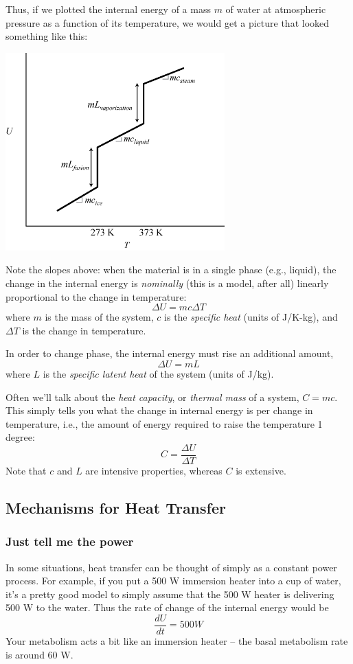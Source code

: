\documentclass[10pt]{book}
\newcommand{\beforefig}{\vspace{0.2in}}
\newcommand{\afterfig}{\vspace{0.2in}}
\begin{document}
Thus, if we plotted the internal energy of a mass $m$ of water at atmospheric pressure as a function of its temperature, we would get a picture that looked something like this:

\beforefig
 \centerline{\includegraphics[height=3in]{figs/SpecificHeatWater}}
\afterfig

Note the slopes above: when the material is in a single phase (e.g., liquid), the change in the internal energy is {\it nominally} (this is a model, after all) linearly proportional to the change in temperature:
$$ \Delta U = m c \Delta T$$
where $m$  is the mass of the system, $c$ is the {\it specific heat} (units of J/K-kg), and $\Delta T$ is the change in temperature.

In order to change phase, the internal energy must rise an additional amount,
$$\Delta U = m L$$
where $L$ is the {\it specific latent heat} of the system (units of J/kg).

Often we'll talk about the {\it heat capacity}, or {\it thermal mass} of a system, $C = m c$.  This simply tells you what the change in internal energy is per change in temperature, i.e., the amount of energy required to raise the temperature 1 degree:
$$C = \frac{\Delta U}{\Delta T}$$ 
Note that $c$ and $L$ are intensive properties, whereas $C$ is extensive.

\subsection{Mechanisms for Heat Transfer}

\subsubsection{Just tell me the power}

In some situations, heat transfer can be thought of simply as a constant power process.  For example, if you put a 500 W immersion heater into a cup of water, it's a pretty good model to simply assume that the 500 W heater is delivering 500 W to the water.  Thus the rate of change of the internal energy would be
$$\frac{dU}{dt} = 500 W$$
Your metabolism acts a bit like an immersion heater -- the basal metabolism rate is around 60 W.
\end{document}
